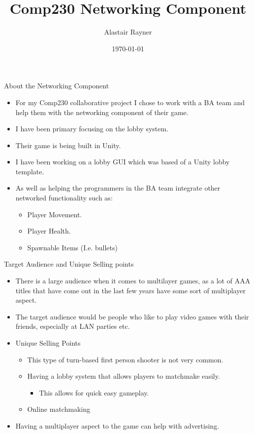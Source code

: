 \documentclass{beamer}
\title{Comp230 Networking Component}
\author{Alastair Rayner}
\date{\today}
\begin{document}
\maketitle

\begin{frame}{About the Networking Component}
	\begin{itemize}
		\item For my Comp230 collaborative project I chose to work with a BA team and help them with the networking component of their game.\pause
		\item I have been primary focusing on the lobby system. \pause
		\item Their game is being built in Unity. \pause
		\item I have been working on a lobby GUI which was based of a Unity lobby template. \pause
		\item As well as helping the programmers in the BA team integrate other networked functionality such as: \pause
		\begin{itemize}
			\item Player Movement. \pause
			\item Player Health. \pause
			\item Spawnable Items (I.e. bullets)
		\end{itemize}
	\end{itemize}
\end{frame}

\begin{frame}{Target Audience and Unique Selling points}
	\begin{itemize}
		\item There is a large audience when it comes to multilayer games, as a lot of AAA titles that have come out in the last few years have some sort of multiplayer aspect. \pause
		\item The target audience would be people who like to play video games with their friends, especially at LAN parties etc. \pause
		\item Unique Selling Points \pause
			\begin{itemize}
				\item This type of turn-based first person shooter is not very common. \pause
				\item Having a lobby system that allows players to matchmake easily. \pause
				\begin{itemize}
					\item This allows for quick easy gameplay.  \pause
				\end{itemize}
				\item  Online matchmaking \pause
				
			\end{itemize}
		\item Having a multiplayer aspect to the game can help with advertising.
	\end{itemize}
\end{frame}
\end{document}
